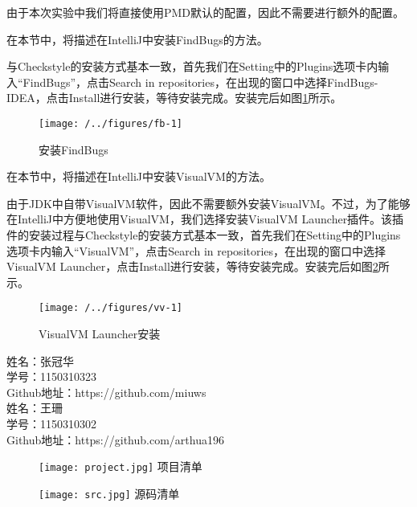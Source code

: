 由于本次实验中我们将直接使用PMD默认的配置，因此不需要进行额外的配置。

在本节中，将描述在IntelliJ中安装FindBugs的方法。

与Checkstyle的安装方式基本一致，首先我们在Setting中的Plugins选项卡内输入“FindBugs”，点击Search in repositories，在出现的窗口中选择FindBugs-IDEA，点击Install进行安装，等待安装完成。安装完后如图\ref{fig:fb-1}所示。

\begin{figure}
\centering
\texttt{[image: /../figures/fb-1]}
\caption{安装FindBugs}
\label{fig:fb-1}
\end{figure}

在本节中，将描述在IntelliJ中安装VisualVM的方法。

由于JDK中自带VisualVM软件，因此不需要额外安装VisualVM。不过，为了能够在IntelliJ中方便地使用VisualVM，我们选择安装VisualVM Launcher插件。该插件的安装过程与Checkstyle的安装方式基本一致，首先我们在Setting中的Plugins选项卡内输入“VisualVM”，点击Search in repositories，在出现的窗口中选择VisualVM Launcher，点击Install进行安装，等待安装完成。安装完后如图\ref{fig:vv-1}所示。

\begin{figure}
\centering
\texttt{[image: /../figures/vv-1]}
\caption{VisualVM Launcher安装}
\label{fig:vv-1}
\end{figure}



\noindent 姓名：张冠华~\\
学号：1150310323~\\
Github地址：https://github.com/miuws~\\

\noindent 姓名：王珊~\\
学号：1150310302~\\
Github地址：https://github.com/arthua196
\begin{figure}[h]
\begin{center}
  \texttt{[image: project.jpg]}
  项目清单
\end{center}
\end{figure}

\begin{figure}[h]
\begin{center}
  \texttt{[image: src.jpg]}
  源码清单
\end{center}
\end{figure}


